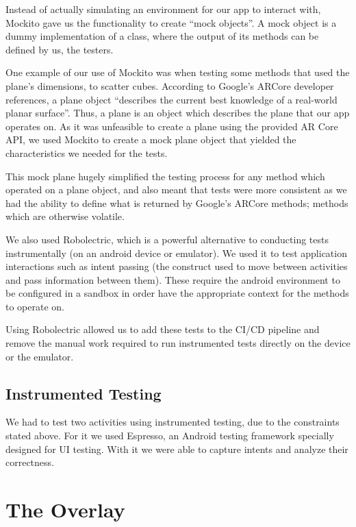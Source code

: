 \documentclass{l3proj}
\begin{document}
Instead of actually simulating an environment for our app to interact with, Mockito 
gave us the functionality to create “mock objects”. A mock object is a dummy 
implementation of a class, where the output of its methods can be defined by us, 
the testers.

One example of our use of Mockito was when testing some methods that used the plane's dimensions,
to scatter cubes. According to Google's ARCore developer references, a plane object “describes the 
current best knowledge of a real-world planar surface”\cite{Plane}. Thus, a plane is an object 
which describes the plane that our app operates on. As it was unfeasible to create a plane
using the provided AR Core API, we used Mockito to create a mock plane object
that yielded the characteristics we needed for the tests\cite{MockitoRerence}.

This mock plane hugely simplified the testing process for any method which 
operated on a plane object, and also meant that tests were more consistent as 
we had the ability to define what is returned by Google's ARCore methods; methods 
which are otherwise volatile.

We also used Robolectric, which is a powerful alternative to conducting tests instrumentally (on 
an android device or emulator)\cite{Roboelectric}. We used it to test application interactions
such as intent passing (the construct used to move between activities and pass 
information between them). These require the android environment to be configured in
a sandbox in order have the appropriate context for the methods to operate on.

Using Robolectric allowed us to add these tests to the CI/CD pipeline and remove
the manual work required to run instrumented tests directly on the device or the
emulator.

\subsection{Instrumented Testing}

We had to test two activities using instrumented testing, due to the constraints
stated above. For it we used Espresso, an Android testing framework specially 
designed for UI testing. With it we were able to capture intents and analyze their
correctness\cite{Espresso}.



\section{The Overlay}
\end{document}
